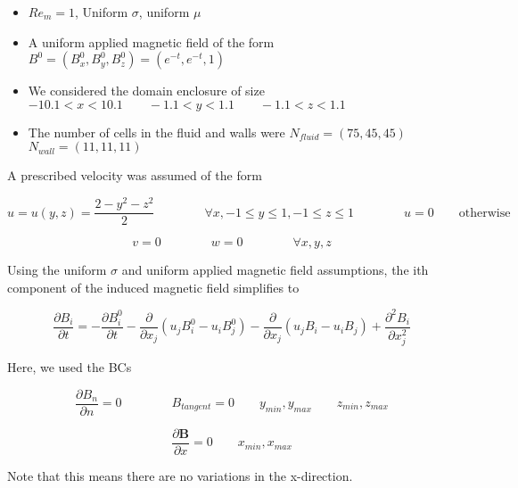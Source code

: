 \documentclass[11pt]{article}
\begin{document}
\begin{itemize}
\item $Re_m = 1$, Uniform $\sigma$, uniform $\mu$
\item A uniform applied magnetic field of the form $B^0 = (B_x^0,B_y^0,B_z^0) = (e^{-t},e^{-t},1)$
\item We considered the domain enclosure of size $-10.1 < x < 10.1 \qquad -1.1 < y < 1.1 \qquad -1.1 < z < 1.1$
\item The number of cells in the fluid and walls were $N_{fluid} = (75,45,45)$ \qquad $N_{wall} = (11,11,11)$
\end{itemize}

A prescribed velocity was assumed of the form

\begin{equation}
	u
	=
	u(y,z)
	= \frac{2 - y^2 - z^2}{2}
	\qquad \qquad
	\forall x
	,
	-1 \le y \le 1
	,
	-1 \le z \le 1
	\qquad \qquad
	u = 0 
	\qquad
	\text{otherwise}
\end{equation}

\begin{equation}
	v = 0
	\qquad \qquad
	w = 0
	\qquad \qquad
	\forall x,y,z
\end{equation}


Using the uniform $\sigma$ and uniform applied magnetic field assumptions, the ith component of the induced magnetic field simplifies to

\begin{equation}
	\frac{\partial B_i}{\partial t} 
	=
	-
	\frac{\partial B_i^0}{\partial t}
	-
	\frac{\partial}{\partial x_j} (u_j B_i^0 - u_i B_j^0) 
	-
	\frac{\partial}{\partial x_j} (u_j B_i - u_i B_j) 
	+
	\frac{\partial^2 B_i}{\partial x_j^2} 
\end{equation}

Here, we used the BCs

\begin{equation}
	\frac{\partial B_{n}}{\partial n} = 0
	\qquad \qquad
	B_{tangent} = 0
	\qquad
	y_{min}, y_{max}
	\qquad
	z_{min}, z_{max}
\end{equation}

\begin{equation}
	\frac{\partial \pmb{B}}{\partial x} = 0
	\qquad
	x_{min}, x_{max}
\end{equation}

Note that this means there are no variations in the x-direction. 
\end{document}
